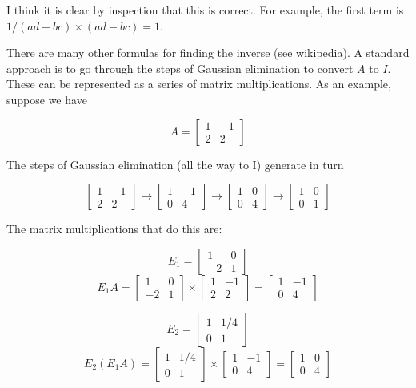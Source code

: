 \documentclass[11pt, oneside]{article}
\begin{document}
I think it is clear by inspection that this is correct.  For example, the first term is $1/(ad-bc) \times (ad - bc) = 1$.

There are many other formulas for finding the inverse (see wikipedia).  A standard approach is to go through the steps of Gaussian elimination to convert $A$ to $I$.  These can be represented as a series of matrix multiplications.  As an example, suppose we have

\[ A = 
\begin{bmatrix}
1 & -1 \\
2 & 2
 \end{bmatrix}
\]

The steps of Gaussian elimination (all the way to I) generate in turn

\[ 
\begin{bmatrix}
1 & -1 \\
2 & 2
 \end{bmatrix}
 \rightarrow
\begin{bmatrix}
1 & -1 \\
0 & 4
 \end{bmatrix}
 \rightarrow
\begin{bmatrix}
1 & 0 \\
0 & 4
 \end{bmatrix}
 \rightarrow
\begin{bmatrix}
1 & 0 \\
0 & 1
 \end{bmatrix}
\]

The matrix multiplications that do this are:

\[ 
E_1 = 
\begin{bmatrix}
1 & 0 \\
-2 & 1
 \end{bmatrix}
\]
\[
E_1 A = 
\begin{bmatrix}
1 & 0 \\
-2 & 1
 \end{bmatrix}
\times
\begin{bmatrix}
1 & -1 \\
2 & 2
 \end{bmatrix}
 =
\begin{bmatrix}
1 & -1 \\
0 & 4
 \end{bmatrix}
\]

\[ E_2 =
\begin{bmatrix}
1 & 1/4 \\
0 & 1
 \end{bmatrix}
\]
\[ 
E_2(E_1 A) = 
\begin{bmatrix}
1 & 1/4 \\
0 & 1
 \end{bmatrix}
\times
\begin{bmatrix}
1 & -1 \\
0 & 4
 \end{bmatrix}
 =
\begin{bmatrix}
1 & 0 \\
0 & 4
 \end{bmatrix}
\]
\end{document}

